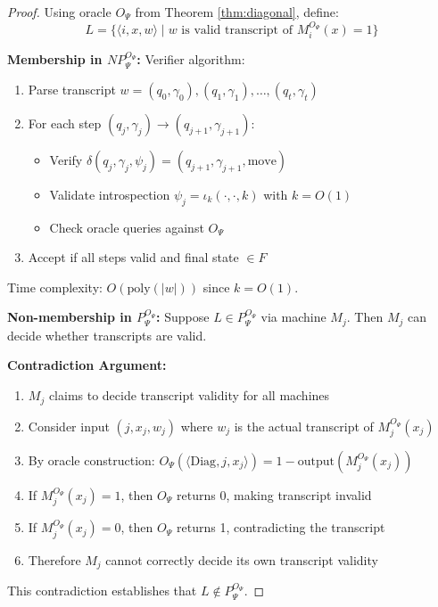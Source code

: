 \documentclass[11pt]{article}
\begin{document}
\begin{proof}
Using oracle $O_\Psi$ from Theorem \ref{thm:diagonal}, define:
$$L = \{\langle i, x, w \rangle \mid w \text{ is valid transcript of } M_i^{O_\Psi}(x) = 1\}$$

\textbf{Membership in $NP^{O_\Psi}_\Psi$:}
Verifier algorithm:
\begin{enumerate}
\item Parse transcript $w = (q_0, \gamma_0), (q_1, \gamma_1), \ldots, (q_t, \gamma_t)$
\item For each step $(q_j, \gamma_j) \to (q_{j+1}, \gamma_{j+1})$:
   \begin{itemize}
   \item Verify $\delta(q_j, \gamma_j, \psi_j) = (q_{j+1}, \gamma_{j+1}, \text{move})$
   \item Validate introspection $\psi_j = \iota_k(\cdot, \cdot, k)$ with $k = O(1)$
   \item Check oracle queries against $O_\Psi$
   \end{itemize}
\item Accept if all steps valid and final state $\in F$
\end{enumerate}
Time complexity: $O(\text{poly}(|w|))$ since $k = O(1)$.

\textbf{Non-membership in $P^{O_\Psi}_\Psi$:}
Suppose $L \in P^{O_\Psi}_\Psi$ via machine $M_j$. Then $M_j$ can decide whether transcripts are valid.

\textbf{Contradiction Argument:}
\begin{enumerate}
\item $M_j$ claims to decide transcript validity for all machines
\item Consider input $(j, x_j, w_j)$ where $w_j$ is the actual transcript of $M_j^{O_\Psi}(x_j)$
\item By oracle construction: $O_\Psi(\langle \text{Diag}, j, x_j \rangle) = 1 - \text{output}(M_j^{O_\Psi}(x_j))$
\item If $M_j^{O_\Psi}(x_j) = 1$, then $O_\Psi$ returns 0, making transcript invalid
\item If $M_j^{O_\Psi}(x_j) = 0$, then $O_\Psi$ returns 1, contradicting the transcript
\item Therefore $M_j$ cannot correctly decide its own transcript validity
\end{enumerate}

This contradiction establishes that $L \notin P^{O_\Psi}_\Psi$.
\end{proof}
\end{document}
